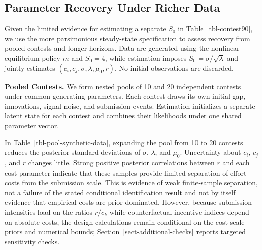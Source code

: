 \documentclass[mnsc]{informs3}
\begin{document}
\subsection{Parameter Recovery Under Richer Data}\label{sect-synthetic-richer}

{Given the limited evidence for estimating a separate $S_0$ in Table~\ref{tbl-contest90}, we use the more parsimonious steady-state specification to assess recovery from pooled contests and longer horizons. Data are generated using the nonlinear equilibrium policy $m$ and $S_0=4$, while estimation imposes $S_0=\sigma/\sqrt\lambda$ and jointly estimates $(c_i,c_j,\sigma,\lambda,\mu_0,r)$. No initial observations are discarded.}


{\textbf{Pooled Contests.}}
We form nested pools of 10 and 20 independent contests under common generating parameters. Each contest draws its own initial gap, innovations, signal noise, and submission events. Estimation initializes a separate latent state for each contest and combines their likelihoods under one shared parameter vector.

In Table~\ref{tbl-pool-synthetic-data}, expanding the pool from 10 to 20 contests reduces the posterior standard deviations of $\sigma$, $\lambda$, and $\mu_0$. Uncertainty about $c_i$, $c_j$, and $r$ changes little. Strong positive posterior correlations between $r$ and each cost parameter indicate that these samples provide limited separation of effort costs from the submission scale.
{This is evidence of weak finite-sample separation, not a failure of the stated conditional identification result and not by itself evidence that empirical costs are prior-dominated. However, because submission intensities load on the ratios $r/c_k$ while counterfactual incentive indices depend on absolute costs, the design calculations remain conditional on the cost-scale priors and numerical bounds; Section~\ref{sect-additional-checks} reports targeted sensitivity checks.}
\end{document}
